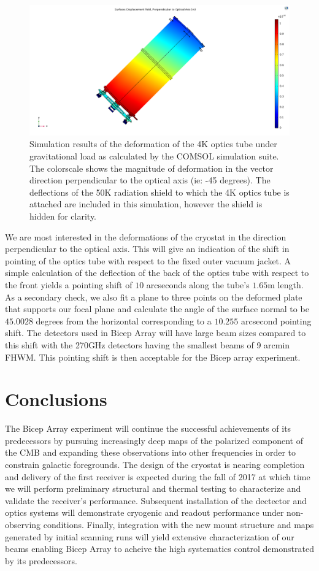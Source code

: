 \documentclass[12pt]{article}
\begin{document}
\begin{figure}
	\center
	\includegraphics[width=.9\textwidth]{disp_45_perp_4_shell.png}
	\caption{Simulation results of the deformation of the 4K optics tube under
	gravitational load as calculated by the COMSOL simulation suite. The
	colorscale shows the magnitude of deformation in the vector direction
	perpendicular to the optical axis (ie: -45 degrees). The deflections of
	the 50K radiation shield to which the 4K optics tube is attached are
	included in this simulation, however the shield is hidden for clarity.}
	\label{fig:pointing}
\end{figure}



We are most interested in the deformations of the cryostat in the direction
perpendicular to the optical axis. This will give an indication of the shift
in pointing of the optics tube with respect to the fixed outer vacuum jacket.
A simple calculation of the deflection of the back of the optics tube with
respect to the front yields a pointing shift of $10$ arcseconds along the
tube's $1.65$m length. As a secondary check, we also fit a plane to three
points on the deformed plate that supports our focal plane and calculate the angle of the surface normal
to be $45.0028$ degrees from the horizontal corresponding to a $10.255$ arcsecond pointing shift.
The detectors used in Bicep Array will have large beam sizes compared to this
shift with the 270GHz detectors having the smallest beams of 9 arcmin FHWM.
This pointing shift is then acceptable for the Bicep array experiment.



\section{Conclusions}
The Bicep Array experiment will continue the successful achievements of its
predecessors by pursuing increasingly deep maps of the polarized component of
the CMB and expanding these observations into other frequencies in order to
constrain galactic foregrounds. The design of the cryostat is nearing
completion and delivery of the first receiver is expected during the fall of
2017 at which time we will perform preliminary structural and thermal testing
to characterize and validate the receiver's performance. Subsequent
installation of the dectector and optics systems will demonstrate cryogenic and
readout performance under non-observing conditions. Finally, integration with
the new mount structure and maps generated by initial scanning runs will yield
extensive characterization of our beams enabling Bicep Array to acheive the
high systematics control demonstrated by its predecessors. 
\end{document}
